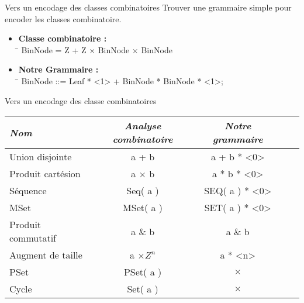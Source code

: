 \documentclass{beamer}
\begin{document}
\begin{frame}{Vers un encodage des classes combinatoires }
Trouver une grammaire simple pour encoder les classes combinatoire. \newline
\begin{itemize}
\item
\begin{tabbing}
\textbf{Classe combinatoire :} \\
\hspace{0.5cm} \= \kill
\> BinNode = Z + Z $\times$ BinNode $\times$ BinNode \\  %
\end{tabbing}


\item
\begin{tabbing}
\textbf{Notre Grammaire :} \\
\hspace{0.5cm} \= \kill
\> BinNode ::= Leaf * <1> + BinNode * BinNode * <1>; \\
\end{tabbing}
\end{itemize} 

\end{frame}







\begin{frame}{Vers un encodage des classe combinatoires}
  
\begin{tabular}{|l|c|c|c|c|}
\hline
\emph{Nom} & \emph{Analyse combinatoire} & \emph{Notre grammaire} \\
\hline\hline
Union disjointe & a + b & a + b * <0>\\\hline
Produit cartésion & a $\times$ b & a * b * <0>\\\hline
Séquence & Seq( a ) & SEQ( a ) * <0> \\\hline
MSet & MSet( a )  & SET( a ) * <0> \\\hline
Produit commutatif & a \& b & a \& b \\\hline
Augment de taille & a $\times Z^{n}$ & a * <n> \\\hline
PSet  & PSet( a )  & $\times$ \\\hline
Cycle  & Set( a )  & $\times$ \\\hline
\end{tabular} 

\end{frame}
\end{document}
